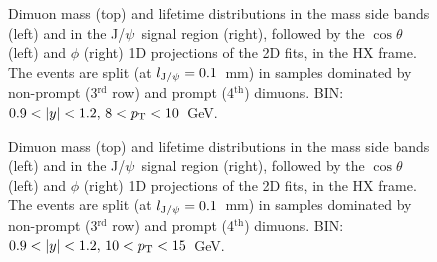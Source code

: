 \documentclass[12pt]{article}
\newcommand{\JPsi}{J/$\psi$}
\begin{document}
\begin{figure}[htbp]
\centering
{}
\caption{Dimuon mass (top) and lifetime distributions in the mass side bands 
(left) and in the \JPsi\ signal region (right), followed by the
$\cos\theta$ (left) and $\phi$ (right) 1D projections of the 2D fits,
in the HX frame. The events are split (at $l_{{\rm J}/\psi} = 0.1$~mm) 
in samples dominated by non-prompt (3$^\mathrm{rd}$ row) and 
prompt (4$^\mathrm{th}$) dimuons. BIN: $0.9 <|y|<1.2,\, 8 < p_{\rm T} < 10$~GeV.}
\end{figure}
\clearpage

\begin{figure}[htbp]
\centering
{}
\caption{Dimuon mass (top) and lifetime distributions in the mass side bands 
(left) and in the \JPsi\ signal region (right), followed by the
$\cos\theta$ (left) and $\phi$ (right) 1D projections of the 2D fits,
in the HX frame. The events are split (at $l_{{\rm J}/\psi} = 0.1$~mm) 
in samples dominated by non-prompt (3$^\mathrm{rd}$ row) and 
prompt (4$^\mathrm{th}$) dimuons. BIN: $0.9 <|y|<1.2,\, 10 < p_{\rm T} < 15$~GeV.}
\end{figure}
\clearpage
\end{document}
